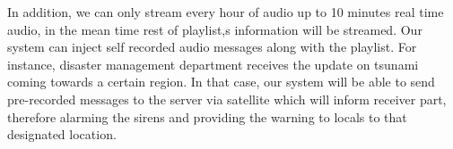  In addition, we can only stream every hour of audio up to 10 minutes real time audio, in the mean time rest of  playlist,s information will be streamed. Our system can inject self recorded audio messages along with the playlist. For instance, disaster management department receives the update on tsunami coming towards a certain region. In that case, our system will be able to send pre-recorded messages to the server via satellite which will inform receiver part, therefore alarming the sirens and providing the warning to locals to that designated location.

	